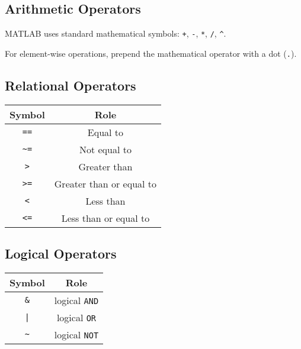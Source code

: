\documentclass{article}
\begin{document}
\subsection*{Arithmetic Operators}
MATLAB uses standard mathematical symbols: \lstinline!+!, \lstinline!-!, \lstinline!*!, \lstinline!/!, \lstinline!^!.

\noindent For element-wise operations, prepend the mathematical operator with a dot (\lstinline!.!).
\begin{multicols}{2}
    \subsection*{Relational Operators}
    \begin{table}[H]
        \centering
        \begin{tabular}{c | c}
            \toprule
            \textbf{Symbol} & \textbf{Role}            \\
            \midrule
            \lstinline!==!  & Equal to                 \\
            \lstinline!~=!  & Not equal to             \\
            \lstinline!>!   & Greater than             \\
            \lstinline!>=!  & Greater than or equal to \\
            \lstinline!<!   & Less than                \\
            \lstinline!<=!  & Less than or equal to    \\
            \bottomrule
        \end{tabular}
    \end{table}
    \columnbreak
    \subsection*{Logical Operators}
    \begin{table}[H]
        \centering
        \begin{tabular}{c | c}
            \toprule
            \textbf{Symbol} & \textbf{Role}           \\
            \midrule
            \lstinline!&!   & logical \lstinline!AND! \\
            \lstinline!|!   & logical \lstinline!OR!  \\
            \lstinline!~!   & logical \lstinline!NOT! \\
            \bottomrule
        \end{tabular}
    \end{table}
\end{multicols}
\end{document}
